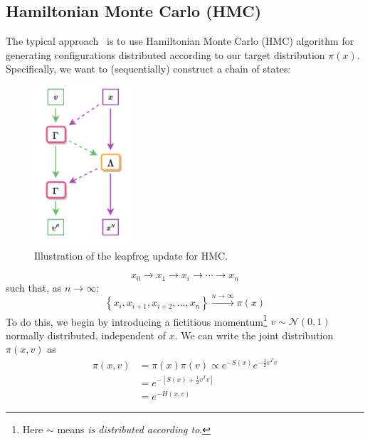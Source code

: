 \documentclass[a4paper,11pt]{article}
\begin{document}
\subsection{\label{subsec:hmc}Hamiltonian Monte Carlo (HMC)}
%
The typical approach~\cite{HMC} is to use Hamiltonian Monte Carlo (HMC)
algorithm for generating configurations distributed according to our
target distribution $\pi(x)$.
%
%
Specifically, we want to (sequentially) construct a chain of states:
%
\begin{figure}
  \begin{center}
  \includegraphics[width=0.33\textwidth]{assets/hmc-update6.pdf}
  \end{center}
    \caption{\label{fig:hmc-update}Illustration of the leapfrog update for HMC.}
\end{figure}
%
\begin{equation}
x_{0} \rightarrow x_{1} \rightarrow x_{i} \rightarrow \cdots \rightarrow x_{n}
\end{equation}
%
such that, as $n \rightarrow \infty$:
%
\begin{equation}
\left\{x_{i}, x_{i+1}, x_{i+2}, \ldots, x_{n}\right\} \xrightarrow[]{n\rightarrow\infty} \pi(x)
\end{equation}
%
To do this, we begin by introducing a fictitious momentum\footnote{Here $\sim$
means \textit{is distributed according to}.} $v \sim \mathcal{N}(0, 1)$
normally distributed, independent of $x$.
%
We can write the joint distribution $\pi(x, v)$ as
%
\begin{align}
\pi(x, v) &= \pi(x) \pi(v) \propto e^{-S(x)} e^{-\frac{1}{2} v^{T}v} \\
&= e^{-\left[S(x) + \frac{1}{2} v^{T} v \right]} \\
&= e^{-H(x, v)}
\end{align}
\end{document}
